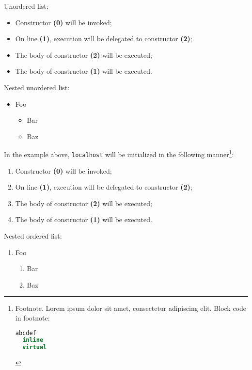 \documentclass[twoside,10pt,letterpaper,usenames]{newstyle-PearsonGeneric-7-38}
\begin{document}
Unordered list:

\begin{itemize}
\item{Constructor \textbf{(0)} will be invoked;}
\item{On line \textbf{(1)}, execution will be delegated to constructor \textbf{(2)};}
\item{The body of constructor \textbf{(2)} will be executed;}
\item{The body of constructor \textbf{(1)} will be executed.}
\end{itemize}

Nested unordered list:

\begin{itemize}
\item{Foo\begin{itemize}
\item{Bar}
\item{Baz}
\end{itemize}
}
\end{itemize}

In the example above, \texttt{localhost} will be initialized in the
following manner{\cprotect\footnote{Footnote. Lorem ipsum dolor sit
  amet, consectetur adipiscing elit. Block code in footnote:

  \begin{lstlisting}[language=C++, basicstyle={\ttfamily\footnotesize}]
  abcdef
  inline
  virtual
  \end{lstlisting}
      }}:

\begin{enumerate}
\item{Constructor \textbf{(0)} will be invoked;}
\item{On line \textbf{(1)}, execution will be delegated to constructor \textbf{(2)};}
\item{The body of constructor \textbf{(2)} will be executed;}
\item{The body of constructor \textbf{(1)} will be executed.}
\end{enumerate}

Nested ordered list:

\begin{enumerate}
\item{Foo\begin{enumerate}
\item{Bar}
\item{Baz}
\end{enumerate}
}
\end{enumerate}
\end{document}
